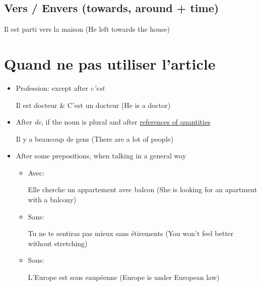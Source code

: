 \documentclass{book}
\begin{document}
        \subsection{Vers / Envers (towards, around + time)}
            \begin{center}
                Il est parti vers la maison (He left towards the house)
            \end{center}
    
    \section{Quand ne pas utiliser l'article}
        \begin{itemize}
            \item Profession: except after \textit{c'est}
                \begin{center}
                    Il est docteur \& C'est un docteur (He is a doctor)
                \end{center}

            \item After \textit{de}, if the noun is plural and after \underline{references of quantities}
                \begin{center}
                    Il y a beaucoup de gens (There are a lot of people)
                \end{center}

            \item After some prepositions, when talking in a general way
                \begin{itemize}
                    \item Avec:
                        \begin{center}
                            Elle cherche un appartement avec balcon (She is looking for an apartment with a balcony)
                        \end{center}

                    \item Sans:
                        \begin{center}
                            Tu ne te sentiras pas mieux sans étirements (You won't feel better without stretching)
                        \end{center}

                    \item Sous:
                        \begin{center}
                            L'Europe est sous eaupéenne (Europe is under European law)
                        \end{center}


\end{itemize}
\end{itemize}
\end{document}
